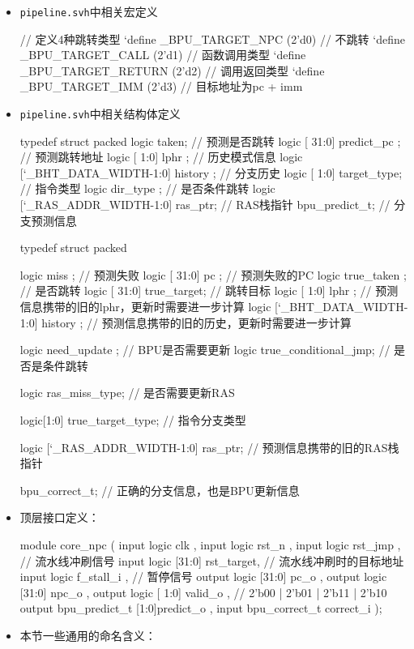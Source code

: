 \begin{itemize}
\item
  \texttt{pipeline.svh}中相关宏定义

\begin{CodeBlock}[language=BookSystemVerilog]
// 定义4种跳转类型
`define _BPU_TARGET_NPC  (2'd0)    // 不跳转
`define _BPU_TARGET_CALL (2'd1)    // 函数调用类型
`define _BPU_TARGET_RETURN (2'd2)  // 调用返回类型
`define _BPU_TARGET_IMM (2'd3)     // 目标地址为pc + imm
\end{CodeBlock}
\item
  \texttt{pipeline.svh}中相关结构体定义

\begin{CodeBlock}[language=BookSystemVerilog]
typedef struct packed {
  logic taken;  // 预测是否跳转
  logic [                31:0] predict_pc ;  // 预测跳转地址
  logic [                 1:0] lphr       ;  // 历史模式信息
  logic [`_BHT_DATA_WIDTH-1:0] history    ;  // 分支历史
  logic [                 1:0] target_type;  // 指令类型
  logic                        dir_type   ;  // 是否条件跳转
  logic [`_RAS_ADDR_WIDTH-1:0] ras_ptr;  // RAS栈指针
} bpu_predict_t;  // 分支预测信息

typedef struct packed {
  logic                        miss       ;  // 预测失败
  logic [                31:0] pc         ;  // 预测失败的PC
  logic                        true_taken ;  // 是否跳转
  logic [                31:0] true_target;  // 跳转目标
  logic [                 1:0] lphr       ;  // 预测信息携带的旧的lphr，更新时需要进一步计算
  logic [`_BHT_DATA_WIDTH-1:0] history    ;  // 预测信息携带的旧的历史，更新时需要进一步计算

  logic need_update         ;  // BPU是否需要更新
  logic true_conditional_jmp;  // 是否是条件跳转

  logic ras_miss_type;  // 是否需要更新RAS

  logic[1:0] true_target_type;  // 指令分支类型

  logic [`_RAS_ADDR_WIDTH-1:0] ras_ptr;  // 预测信息携带的旧的RAS栈指针
} bpu_correct_t;  // 正确的分支信息，也是BPU更新信息


\end{CodeBlock}
\item
  顶层接口定义：

\begin{CodeBlock}[language=BookSystemVerilog]
module core_npc (
  input  logic              clk       ,
  input  logic              rst_n     ,
  input  logic              rst_jmp   ,  // 流水线冲刷信号
  input  logic [31:0]       rst_target,  // 流水线冲刷时的目标地址
  input  logic              f_stall_i ,  // 暂停信号
  output logic [31:0]       pc_o      ,
  output logic [31:0]       npc_o     ,
  output logic [ 1:0]       valid_o   ,  // 2'b00 | 2'b01 | 2'b11 | 2'b10
  output bpu_predict_t [1:0]predict_o ,
  input  bpu_correct_t      correct_i
);
\end{CodeBlock}
\item
  本节一些通用的命名含义：
\end{itemize}

